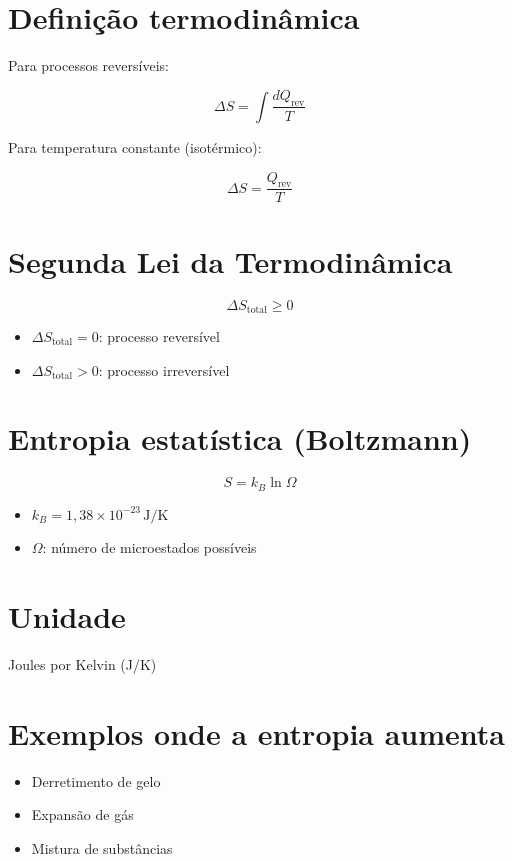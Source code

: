 \section*{Definição termodinâmica}
Para processos reversíveis:

\[
\Delta S = \int \frac{dQ_{\text{rev}}}{T}
\]

Para temperatura constante (isotérmico):

\[
\Delta S = \frac{Q_{\text{rev}}}{T}
\]

\section*{Segunda Lei da Termodinâmica}

\[
\Delta S_{\text{total}} \geq 0
\]

\begin{itemize}
  \item \( \Delta S_{\text{total}} = 0 \): processo reversível
  \item \( \Delta S_{\text{total}} > 0 \): processo irreversível
\end{itemize}

\section*{Entropia estatística (Boltzmann)}

\[
S = k_B \ln \Omega
\]

\begin{itemize}
  \item \( k_B = 1{,}38 \times 10^{-23} \, \text{J/K} \)
  \item \( \Omega \): número de microestados possíveis
\end{itemize}

\section*{Unidade}
Joules por Kelvin (J/K)

\section*{Exemplos onde a entropia aumenta}
\begin{itemize}
  \item Derretimento de gelo
  \item Expansão de gás
  \item Mistura de substâncias
\end{itemize}

